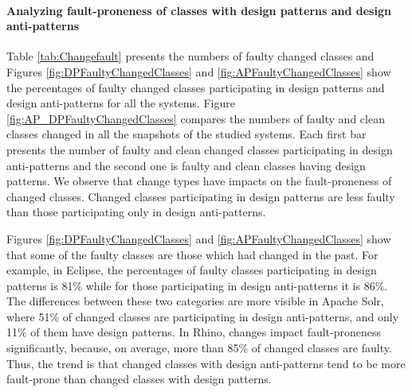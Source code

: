 \paragraph{\textbf{Analyzing fault-proneness of classes with design patterns and design anti-patterns}} Table \ref{tab:Changefault} presents the numbers of faulty changed classes and Figures \ref{fig:DPFaultyChangedClasses} and \ref{fig:APFaultyChangedClasses} show the percentages of faulty changed classes participating in design patterns and design anti-patterns for all the systems. Figure \ref{fig:AP_DPFaultyChangedClasses} compares the numbers of faulty and clean classes changed in all the snapshots of the studied systems. Each first bar presents the number of faulty and clean changed classes participating in design anti-patterns and the second one is faulty and clean classes having design patterns. We observe that change types have impacts on the fault-proneness of changed classes. Changed classes participating in design patterns are less faulty than those participating only in design anti-patterns. 

Figures \ref{fig:DPFaultyChangedClasses} and \ref{fig:APFaultyChangedClasses} show that some of the faulty classes are those which had changed in the past. For example, in Eclipse, the percentages of faulty classes participating in design patterns is 81\% while for those participating in design anti-patterns it is 86\%. The differences between these two categories are more visible in Apache Solr, where 51\% of changed classes are participating in design anti-patterns, and only 11\% of them have design patterns. In Rhino, changes impact fault-proneness significantly, because, on average, more than 85\% of changed classes are faulty. Thus, the trend is that changed classes with design anti-patterns tend to be more fault-prone than changed classes with design patterns.


